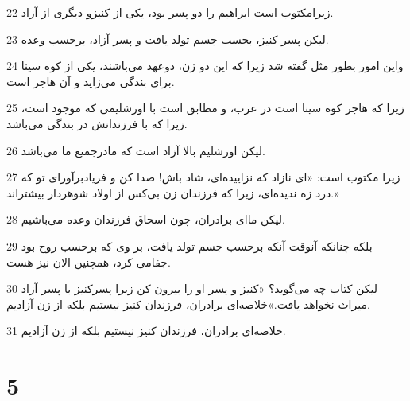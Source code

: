 \par 22 زیرامکتوب است ابراهیم را دو پسر بود، یکی از کنیزو دیگری از آزاد.
\par 23 لیکن پسر کنیز، بحسب جسم تولد یافت و پسر آزاد، برحسب وعده.
\par 24 واین امور بطور مثل گفته شد زیرا که این دو زن، دوعهد می‌باشند، یکی از کوه سینا برای بندگی می‌زاید و آن هاجر است.
\par 25 زیرا که هاجر کوه سینا است در عرب، و مطابق است با اورشلیمی که موجود است، زیرا که با فرزندانش در بندگی می‌باشد.
\par 26 لیکن اورشلیم بالا آزاد است که مادرجمیع ما می‌باشد.
\par 27 زیرا مکتوب است: «ای نازاد که نزاییده‌ای، شاد باش! صدا کن و فریادبرآور‌ای تو که درد زه ندیده‌ای، زیرا که فرزندان زن بی‌کس از اولاد شوهردار بیشتراند.»
\par 28 لیکن ما‌ای برادران، چون اسحاق فرزندان وعده می‌باشیم.
\par 29 بلکه چنانکه آنوقت آنکه برحسب جسم تولد یافت، بر وی که برحسب روح بود جفامی کرد، همچنین الان نیز هست.
\par 30 لیکن کتاب چه می‌گوید؟ «کنیز و پسر او را بیرون کن زیرا پسرکنیز با پسر آزاد میراث نخواهد یافت.»خلاصه‌ای برادران، فرزندان کنیز نیستیم بلکه از زن آزادیم.
\par 31 خلاصه‌ای برادران، فرزندان کنیز نیستیم بلکه از زن آزادیم.

\chapter{5}

